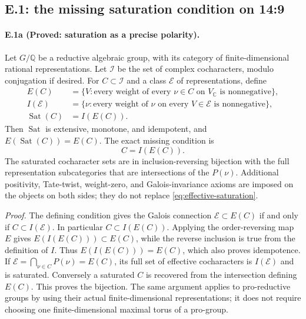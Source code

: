 \subsection{E.1: the missing saturation condition on 14:9}
\label{sec:effectivity-saturation}

\paragraph{E.1a (Proved: saturation as a precise polarity).}
Let $G/\mathbb Q$ be a reductive algebraic group, with its category of
finite-dimensional rational representations. Let $\mathcal I$ be the
set of complex cocharacters, modulo conjugation if desired. For
$C\subset\mathcal I$ and a class $\mathcal E$ of representations,
define
\[
\begin{split}
 E(C)&=\{V:\text{every weight of every }\nu\in C
                 \text{ on }V_{\mathbb C}\text{ is nonnegative}\},\\
 I(\mathcal E)&=\{\nu:\text{every weight of }\nu
                 \text{ on every }V\in\mathcal E
                 \text{ is nonnegative}\},\\
 \operatorname{Sat}(C)&=I(E(C)).
\end{split}
\]
Then $\operatorname{Sat}$ is extensive, monotone, and idempotent, and
$E(\operatorname{Sat}(C))=E(C)$. The exact missing condition is
\begin{equation}\label{eq:effective-saturation}
 C=I(E(C)).
\end{equation}
The saturated cocharacter sets are in inclusion-reversing bijection
with the full representation subcategories that are intersections of
the $P(\nu)$. Additional positivity, Tate-twist, weight-zero, and
Galois-invariance axioms are imposed on the objects on both sides;
they do not replace \eqref{eq:effective-saturation}.

\emph{Proof.}
The defining condition gives the Galois connection
$\mathcal E\subset E(C)$ if and only if $C\subset I(\mathcal E)$.
In particular $C\subset I(E(C))$. Applying the order-reversing map
$E$ gives $E(I(E(C)))\subset E(C)$, while the reverse inclusion is
true from the definition of $I$. Thus $E(I(E(C)))=E(C)$, which also
proves idempotence. If $\mathcal E=\bigcap_{\nu\in C}P(\nu)=E(C)$,
its full set of effective cocharacters is $I(\mathcal E)$ and is
saturated. Conversely a saturated $C$ is recovered from the
intersection defining $E(C)$. This proves the bijection. The same
argument applies to pro-reductive groups by using their actual
finite-dimensional representations; it does not require choosing
one finite-dimensional maximal torus of a pro-group.

